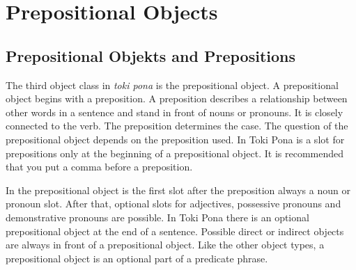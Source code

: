 \section{Prepositional Objects}



%
\subsection*{Prepositional Objekts and Prepositions}
%
The third object class in \textit{toki pona} is the prepositional object. 
A prepositional object begins with a preposition. 
A preposition describes a relationship between other words in a sentence and stand in front of nouns or pronouns. 
It is closely connected to the verb. 
The preposition determines the case. 
The question of the prepositional object depends on the preposition used. 
In Toki Pona is a slot for prepositions only at the beginning of a prepositional object. 
It is recommended that you put a comma before a preposition.

In the prepositional object is the first slot after the preposition always a noun or pronoun slot.
After that, optional slots for adjectives, possessive pronouns and demonstrative pronouns are possible. 
In Toki Pona there is an optional prepositional object at the end of a sentence. 
Possible direct or indirect objects are always in front of a prepositional object. 
Like the other object types, a prepositional object is an optional part of a predicate phrase. 

